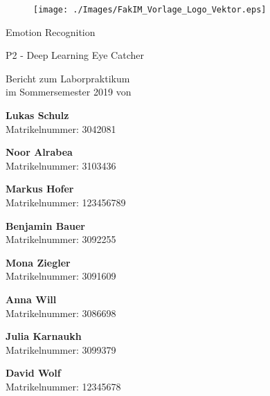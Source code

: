 \documentclass[12pt,a4paper,headinclude,twoside, plainheadsepline, open=right,numbers=noenddot]{scrreprt}
\begin{document}
\pagestyle{empty}

\clearscrheadings\clearscrplain

\begin{titlepage}
\begin{figure}[thb]
       \texttt{[image: ./Images/FakIM\_Vorlage\_Logo\_Vektor.eps]}
\end{figure}
\begin{center}
\rule{0pt}{0pt}
\vfill

\begin{huge}
Emotion Recognition\\[0.75ex]
\end{huge}
\begin{large}
P2 - Deep Learning Eye Catcher
\end{large}


\vfill
\vfill

Bericht zum Laborpraktikum\\
im Sommersemester 2019 von\\
\vfill
\setlength{\columnsep}{.0cm}
\begin{multicols}{1}

\textbf{Lukas Schulz}\\
Matrikelnummer: 3042081

\textbf{Noor Alrabea}\\
Matrikelnummer: 3103436
\end{multicols}

\begin{multicols}{2}
\textbf{Markus Hofer}\\
Matrikelnummer: 123456789

\textbf{Benjamin Bauer}\\
Matrikelnummer: 3092255
\end{multicols}

\begin{multicols}{2}
\textbf{Mona Ziegler}\\
Matrikelnummer: 3091609

\textbf{Anna Will}\\
Matrikelnummer: 3086698
\end{multicols}

\begin{multicols}{2}
\textbf{Julia Karnaukh}\\
Matrikelnummer: 3099379

\textbf{David Wolf}\\
Matrikelnummer: 12345678
\end{multicols}


\end{center}
\end{titlepage}
\end{document}
